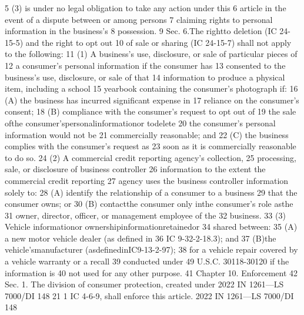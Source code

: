 5 (3) is under no legal obligation to take any action under this
6 article in the event of a dispute between or among persons
7 claiming rights to personal information in the business's
8 possession.
9 Sec. 6.The rightto deletion (IC 24-15-5) and the right to opt out
10 of sale or sharing (IC 24-15-7) shall not apply to the following:
11 (1) A business's use, disclosure, or sale of particular pieces of
12 a consumer's personal information if the consumer has
13 consented to the business's use, disclosure, or sale of that
14 information to produce a physical item, including a school
15 yearbook containing the consumer's photograph if:
16 (A) the business has incurred significant expense in
17 reliance on the consumer's consent;
18 (B) compliance with the consumer's request to opt out of
19 the sale ofthe consumer'spersonalinformationor todelete
20 the consumer's personal information would not be
21 commercially reasonable; and
22 (C) the business complies with the consumer's request as
23 soon as it is commercially reasonable to do so.
24 (2) A commercial credit reporting agency's collection,
25 processing, sale, or disclosure of business controller
26 information to the extent the commercial credit reporting
27 agency uses the business controller information solely to:
28 (A) identify the relationship of a consumer to a business
29 that the consumer owns; or
30 (B) contactthe consumer only inthe consumer's role asthe
31 owner, director, officer, or management employee of the
32 business.
33 (3) Vehicle informationor ownershipinformationretainedor
34 shared between:
35 (A) a new motor vehicle dealer (as defined in
36 IC 9-32-2-18.3); and
37 (B)the vehicle'smanufacturer (asdefinedinIC9-13-2-97);
38 for a vehicle repair covered by a vehicle warranty or a recall
39 conducted under 49 U.S.C. 30118-30120 if the information is
40 not used for any other purpose.
41 Chapter 10. Enforcement
42 Sec. 1. The division of consumer protection, created under
2022 IN 1261—LS 7000/DI 148
21
1 IC 4-6-9, shall enforce this article.
2022 IN 1261—LS 7000/DI 148